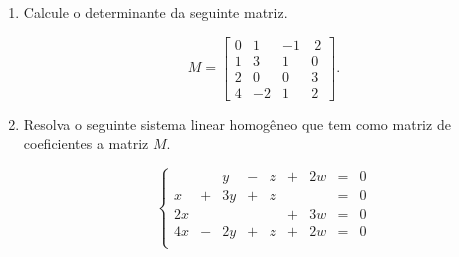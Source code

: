 \begin{problem}
\begin{enumerate}
\item[(a)] Calcule o determinante da seguinte matriz.

$$M=\left[ \begin{array}{rrrr}
 0 &  1 & -1 & \ 2 \\
 1 &  3 &  1 &   0 \\
 2 &  0 &  0 &   3 \\  
 4 & -2 &  1 &   2
\end{array} \right] .$$

\item[(b)] Resolva o seguinte sistema linear homogêneo que tem como matriz de coeficientes a matriz $M$.

$$ \left\{\begin{array}{rrrrrrrrr}
     &   &   y  & - &   z & + &  2w &  = &   0  \\
   x & + &  3y  & + &   z &   &     &  = &   0  \\
  2x &   &      &   &     & + &  3w &  = &   0  \\
	4x & - &  2y  & + &   z & + &  2w &  = &   0  \\
\end{array} \right.$$
\end{enumerate}
\end{problem}
